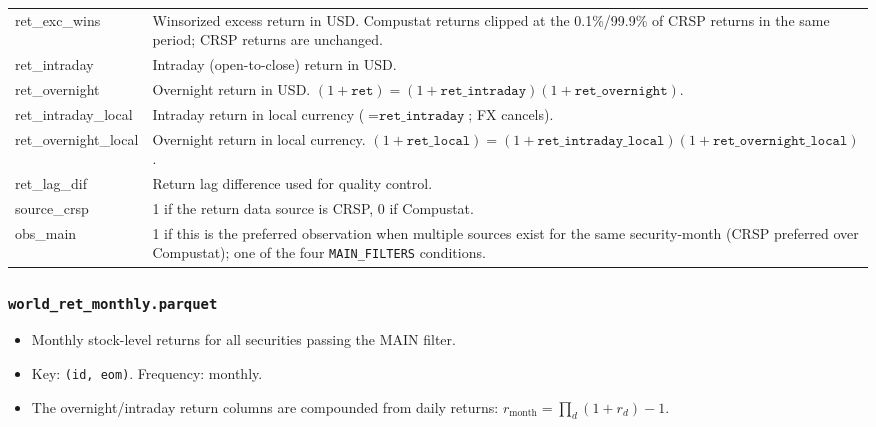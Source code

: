 \documentclass[12pt,title,fleqn]{article}
\begin{document}
{\begin{longtable}{@{\extracolsep{\fill}}|l|m{14.2cm}|@{}}
ret\_exc\_wins & Winsorized excess return in USD. Compustat returns clipped at the 0.1\%/99.9\% of CRSP returns in the same period; CRSP returns are unchanged. \\[1ex]
ret\_intraday & Intraday (open-to-close) return in USD. \\[1ex]
ret\_overnight & Overnight return in USD. $(1+\texttt{ret}) = (1+\texttt{ret\_intraday})(1+\texttt{ret\_overnight})$. \\[1ex]
ret\_intraday\_local & Intraday return in local currency ($=\texttt{ret\_intraday}$; FX cancels). \\[1ex]
ret\_overnight\_local & Overnight return in local currency. $(1+\texttt{ret\_local}) = (1+\texttt{ret\_intraday\_local})(1+\texttt{ret\_overnight\_local})$. \\[1ex]
ret\_lag\_dif & Return lag difference used for quality control. \\[1ex]
source\_crsp & 1 if the return data source is CRSP, 0 if Compustat. \\[1ex]
obs\_main & 1 if this is the preferred observation when multiple sources exist for the same security-month (CRSP preferred over Compustat); one of the four \texttt{MAIN\_FILTERS} conditions. \\[1ex]

\end{longtable}}

\subsubsection{\texttt{world\_ret\_monthly.parquet}}\label{sec:world-ret-monthly}
\begin{itemize}
  \item Monthly stock-level returns for all securities passing the MAIN filter.
  \item Key: \texttt{(id, eom)}.  Frequency: monthly.
  \item The overnight/intraday return columns are compounded from daily returns: $r_{\mathrm{month}} = \prod_{d}(1+r_d)-1$.
\end{itemize}
\end{document}
